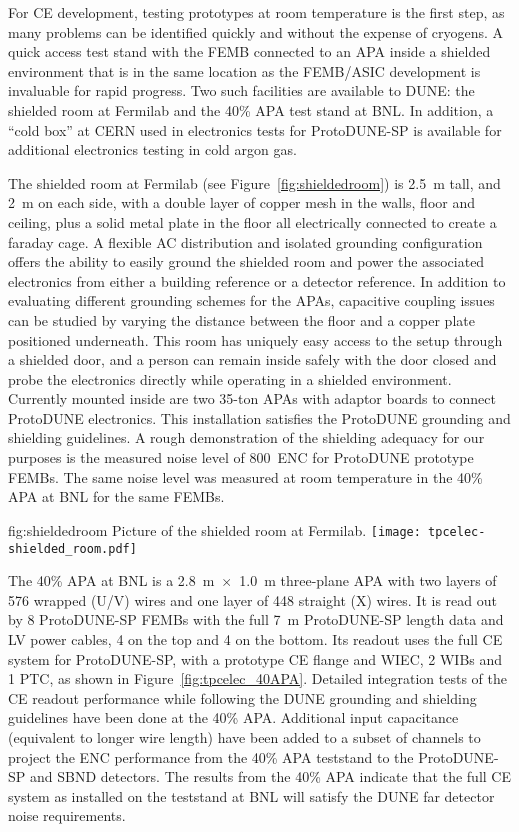 For CE development, testing prototypes at room temperature is the first step, as many problems can be identified quickly and without the expense of cryogens.  A quick access test stand with the FEMB connected to an APA inside a shielded environment that is in the same location as the FEMB/ASIC development is invaluable for rapid progress.  Two such facilities are available to DUNE: the shielded room at Fermilab and the 40\% APA test stand at BNL.  In addition, a ``cold box'' at CERN used in electronics tests for ProtoDUNE-SP is available for additional electronics testing in cold argon gas.

The shielded room at Fermilab (see Figure~\ref{fig:shieldedroom}) is 2.5~m tall, and 2~m on each side, with 
a double layer of copper mesh in the walls, floor and ceiling, plus a solid metal plate in the floor all electrically connected to create a faraday cage.  A flexible AC distribution and isolated grounding configuration offers the ability to easily ground the shielded room and power the associated electronics from either a building reference or a detector reference.  In addition
to evaluating different grounding schemes for the APAs, capacitive coupling issues can be studied by varying the
distance between the floor and a copper plate positioned underneath.   
This room has uniquely easy access to the setup through a shielded door,
and a person can remain inside safely with the door closed and probe the electronics directly while operating
in a shielded environment.  Currently mounted inside are two 35-ton APAs 
with adaptor boards to connect ProtoDUNE electronics.  This installation satisfies the ProtoDUNE grounding and shielding guidelines.  A rough demonstration of the shielding adequacy for our purposes  is the measured noise level of 800~ENC for ProtoDUNE prototype FEMBs.  The same noise level was measured at room temperature in the 40\% APA at BNL for the same FEMBs.

\begin{dunefigure}
{fig:shieldedroom}
{Picture of the shielded room at Fermilab.}
\texttt{[image: tpcelec-shielded\_room.pdf]}
\end{dunefigure}

The 40\% APA at BNL is a 2.8~m~$\times$~1.0~m three-plane APA with two layers of 576 wrapped (U/V) wires and one layer of 448 straight (X) wires. It is read out by 8 ProtoDUNE-SP FEMBs with the full 7~m ProtoDUNE-SP length data and LV power cables, 4 on the top and 4 on the bottom. Its readout uses the full CE system for ProtoDUNE-SP, with a prototype CE flange and WIEC, 2 WIBs and 1 PTC, as shown in Figure~\ref{fig:tpcelec_40APA}. Detailed integration tests of the CE readout performance while following the DUNE grounding and shielding guidelines have been done at the 40\% APA. Additional input capacitance (equivalent to longer wire length) have been added to a subset of channels to project the ENC performance from the 40\% APA teststand to the ProtoDUNE-SP and SBND detectors. The results from the 40\% APA indicate that the full CE system as installed on the teststand at BNL will satisfy the DUNE far detector noise requirements.

